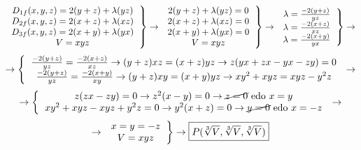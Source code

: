 \begin{equation*}
\left.
  \begin{tabular}{ c }
    $D_{1f}(x,y,z)=2(y+z) + \lambda(yz)$ \\
    $D_{2f}(x,y,z)=2(x+z) + \lambda(xz)$ \\
    $D_{3f}(x,y,z)=2(x+y) + \lambda(yx)$ \\
    $V = xyz$ 
    \end{tabular}
  \right\}
  \rightarrow
  \left.
  \begin{tabular}{ c }
    $2(y+z) + \lambda(yz) = 0$ \\
    $2(x+z) + \lambda(xz) = 0$ \\
    $2(x+y) + \lambda(yx) = 0$ \\
    $V = xyz$ 
  \end{tabular}
  \right\}
  \rightarrow
    \left.
  \begin{tabular}{ c }
    $\lambda = \frac{-2(y+z)}{yz}$ \\
    $\lambda = \frac{-2(x+z)}{xz}$ \\
    $\lambda = \frac{-2(x+y)}{yx}$ \\
  \end{tabular}
  \right\}
  \rightarrow
\end{equation*}
\begin{equation*}
\rightarrow
  \left\{
  \begin{tabular}{ c }
     $\frac{-2(y+z)}{yz} = \frac{-2(x+z)}{xz} \rightarrow (y+z)xz=(x+z)yz \rightarrow z(yx+zx-yx-zy)=0$\\
     $\frac{-2(y+z)}{yz} = \frac{-2(x+y)}{xy} \rightarrow (y+z)xy=(x+y)yz \rightarrow xy^2 + xyz = xyz -y^2z$
  \end{tabular}
  \right.
  \rightarrow
\end{equation*}
\begin{equation*}
\rightarrow
  \left\{
  \begin{tabular}{ c }
    $z(zx-zy)=0 \rightarrow z^2(x-y)=0 \rightarrow \cancel{z=0} \text{ edo } x=y$ \\
    $xy^2 + xyz -xyz +y^2z=0 \rightarrow y^2(x+z)=0 \rightarrow \cancel{y=0} \text{ edo } x=-z$ \\
  \end{tabular}
  \right.
  \rightarrow
\end{equation*}
\begin{equation*}
 \rightarrow
 \left.
 \begin{tabular}{ c }
    $x=y=-z$ \\
    $V=xyz$ \\
  \end{tabular}
  \right\}
  \rightarrow
   \boxed{P(\sqrt[3]{V}, \sqrt[3]{V}, \sqrt[3]{V})}
\end{equation*}
